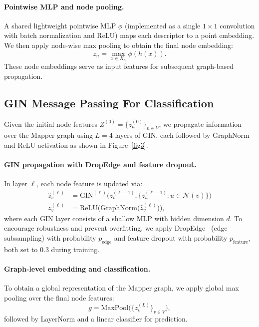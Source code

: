 \documentclass{article}
\begin{document}
\paragraph{Pointwise MLP and node pooling.}
A shared lightweight pointwise MLP $\phi$ (implemented as a single $1\times1$ convolution with batch normalization and ReLU) maps each descriptor to a point embedding. 
We then apply node-wise max pooling to obtain the final node embedding:
$$ z_n = \max_{x\in X_n} \phi(h(x)). $$
These node embeddings serve as input features for subsequent graph-based propagation.

\subsection{GIN Message Passing For Classification}
\label{sec:mapper_gin_arch}
Given the initial node features $Z^{(0)}=\{z^{(0)}_n\}_{n\in V}$, we propagate information over the Mapper graph using $L=4$ layers of GIN, each followed by GraphNorm~\cite{cai2021graphnorm} and ReLU activation as shown in Figure~\ref{fig3}.

\paragraph{GIN propagation with DropEdge and feature dropout.}
In layer $\ell$, each node feature is updated via:
\begin{align*}
\hat{z}^{(\ell)}_v &= \mathrm{GIN}^{(\ell)}\!\big(z^{(\ell-1)}_v, \{z^{(\ell-1)}_u:u\in\mathcal{N}(v)\}\big) \\
z^{(\ell)}_v &= \text{ReLU}\big(\mathrm{GraphNorm}\big(\hat{z}^{(\ell)}_v\big)\big),
\end{align*}
where each GIN layer consists of a shallow MLP with hidden dimension $d$.
To encourage robustness and prevent overfitting, we apply DropEdge~\cite{Rong2019DropEdgeTD} (edge subsampling) with probability $p_{\text{edge}}$ and feature dropout with probability $p_{\text{feature}}$, both set to $0.3$ during training.

\paragraph{Graph-level embedding and classification.}
To obtain a global representation of the Mapper graph, we apply global max pooling over the final node features:
$$ g = \mathrm{MaxPool}\big(\{z^{(L)}_v\}_{v\in V}\big), $$
followed by LayerNorm and a linear classifier for prediction.
\end{document}
